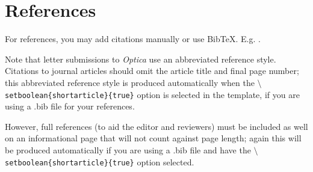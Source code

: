 \documentclass[9pt,twocolumn,twoside]{optica}
\begin{document}
\section*{References}

For references, you may add citations manually or use BibTeX. E.g. \cite{Zhang:14}.

Note that letter submissions to \emph{Optica} use an abbreviated reference style. Citations to journal articles should omit the article title and final page number; this abbreviated reference style is produced automatically when the \texttt{$\setminus$setboolean\{shortarticle\}\{true\}} option is selected in the template, if you are using a .bib file for your references.

However, full references (to aid the editor and reviewers) must be included as well on an informational page that will not count against page length; again this will be produced automatically if you are using a .bib file and have the \texttt{$\setminus$setboolean\{shortarticle\}\{true\}} option selected.






\end{document}
